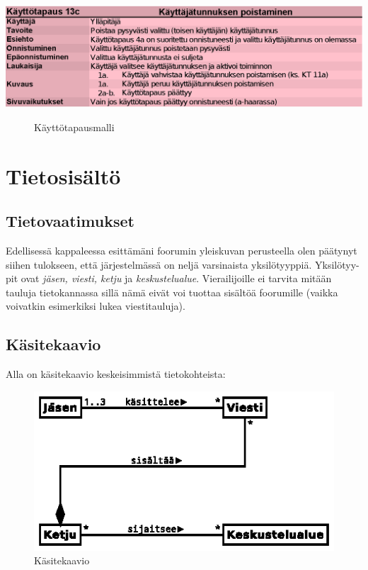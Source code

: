 \documentclass[11pt]{article}
\begin{document}
		\includegraphics[trim = 21mm 0mm 0mm 25mm]{kayttotapausmalli-sivu-9.eps}\\
		
		\begin{figure}
			\caption{Käyttötapausmalli}
		\end{figure}

\newpage
\thispagestyle{plain}
\section{Tietosisältö}
	\subsection{Tietovaatimukset}
		Edellisessä kappaleessa esittämäni foorumin yleiskuvan perusteella olen päätynyt siihen tulokseen,
		että järjestelmässä on neljä varsinaista yksilötyyppiä. Yksilötyy-pit ovat \emph{jäsen, viesti, ketju}
		ja \emph{keskustelualue}. Vierailijoille ei tarvita mitään tauluja tietokannassa sillä nämä eivät
		voi tuottaa sisältöä foorumille (vaikka voivatkin esimerkiksi lukea viestitauluja).		
		
	\subsection{Käsitekaavio} Alla on käsitekaavio keskeisimmistä tietokohteista:
		\begin{figure}[H]		
			\includegraphics[trim = 0mm 0mm 0mm -3mm, scale = 2.0]{kasitekaavio.eps}
			\caption{Käsitekaavio}
		\end{figure}	
		
\end{document}
